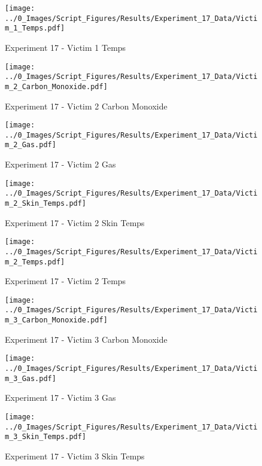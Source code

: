 	\clearpage

	\begin{figure}[H]
		\centering
		\texttt{[image: ../0\_Images/Script\_Figures/Results/Experiment\_17\_Data/Victim\_1\_Temps.pdf]}
		\caption[]{Experiment 17 - Victim 1 Temps}
	\end{figure}
 

	\begin{figure}[H]
		\centering
		\texttt{[image: ../0\_Images/Script\_Figures/Results/Experiment\_17\_Data/Victim\_2\_Carbon\_Monoxide.pdf]}
		\caption[]{Experiment 17 - Victim 2 Carbon Monoxide}
	\end{figure}
 
	\clearpage

	\begin{figure}[H]
		\centering
		\texttt{[image: ../0\_Images/Script\_Figures/Results/Experiment\_17\_Data/Victim\_2\_Gas.pdf]}
		\caption[]{Experiment 17 - Victim 2 Gas}
	\end{figure}
 

	\begin{figure}[H]
		\centering
		\texttt{[image: ../0\_Images/Script\_Figures/Results/Experiment\_17\_Data/Victim\_2\_Skin\_Temps.pdf]}
		\caption[]{Experiment 17 - Victim 2 Skin Temps}
	\end{figure}
 
	\clearpage

	\begin{figure}[H]
		\centering
		\texttt{[image: ../0\_Images/Script\_Figures/Results/Experiment\_17\_Data/Victim\_2\_Temps.pdf]}
		\caption[]{Experiment 17 - Victim 2 Temps}
	\end{figure}
 

	\begin{figure}[H]
		\centering
		\texttt{[image: ../0\_Images/Script\_Figures/Results/Experiment\_17\_Data/Victim\_3\_Carbon\_Monoxide.pdf]}
		\caption[]{Experiment 17 - Victim 3 Carbon Monoxide}
	\end{figure}
 
	\clearpage

	\begin{figure}[H]
		\centering
		\texttt{[image: ../0\_Images/Script\_Figures/Results/Experiment\_17\_Data/Victim\_3\_Gas.pdf]}
		\caption[]{Experiment 17 - Victim 3 Gas}
	\end{figure}
 

	\begin{figure}[H]
		\centering
		\texttt{[image: ../0\_Images/Script\_Figures/Results/Experiment\_17\_Data/Victim\_3\_Skin\_Temps.pdf]}
		\caption[]{Experiment 17 - Victim 3 Skin Temps}
	\end{figure}
 
